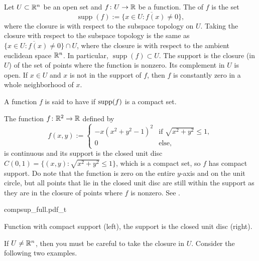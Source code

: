 Let $U \subset {\mathbb{R}}^n$ be an open set and
$f \colon U \to {\mathbb{R}}$ be a function.  The
\emph{} of $f$ is the set
\begin{equation*}
\operatorname{supp} (f) :=
\overline{
\{ x \in U : f(x) \not= 0 \}
} ,
\end{equation*}
where the closure is with respect to the subspace topology on $U$.
Taking the closure with respect to the subspace
topology is the same as 
$\overline{
\{ x \in U : f(x) \not= 0 \}
} \cap U$, where the closure is with respect to the ambient euclidean space
${\mathbb{R}}^n$.
In particular,
$\operatorname{supp} (f) \subset U$.
The support is the closure (in $U$) of the set of points where the
function is nonzero.  Its complement in $U$ is open.
If $x \in U$ and $x$ is not in the support of $f$,
then
$f$ is constantly zero in a whole neighborhood of $x$.

A function $f$ is said to have \emph{}
if $\operatorname{supp}(f)$ is a compact set.

\begin{example}
The function $f \colon {\mathbb{R}}^2 \to {\mathbb{R}}$ defined by
\begin{equation*}
f(x,y) :=
\begin{cases}
-x{(x^2+y^2-1)}^2 & \text{if } \sqrt{x^2+y^2} \leq 1, \\
0                 & \text{else},
\end{cases}
\end{equation*}
is continuous and its support is the closed unit disc
$C(0,1) = \bigl\{ (x,y) : \sqrt{x^2 + y^2} \leq 1 \bigr\}$, which is a compact set, so $f$ has compact support.
Do note that the function is zero on the entire $y$-axis
and on the unit circle, but
all points that lie in the closed unit disc are still within the support
as they are in the closure of points where $f$ is nonzero.
See .
\begin{myfigureht}
{compsup_full.pdf_t}
\caption{Function with compact support (left), the support
is the closed unit disc (right).\label{fig:compsup}}
\end{myfigureht}
\end{example}

If $U \not= {\mathbb{R}}^n$, then you must be careful to
take the closure in $U$.  Consider the following
two examples.

